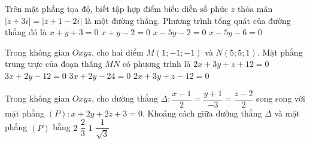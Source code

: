 \begin{ex}%
	Trên mặt phẳng tọa độ, biết tập hợp điểm biểu diễn số phức $z$ thỏa mãn $\left|z+3i\right|=\left| z+1-2i\right|$ là một đường thẳng. Phương trình tổng quát của đường thẳng đó là
	\choice
	{$x+y+3=0$}
	{$x+y-2=0$}
	{\True $x-5y-2=0$}
	{$x-5y-6=0$}
\end{ex}

\begin{ex}%
	Trong không gian $Oxyz$, cho hai điểm $M\left(1;-1;-1\right)$ và $N\left(5;5;1\right)$. Mặt phẳng trung trực của đoạn thẳng $MN$ có phương trình là
	\choice
	{$2x+3y+z+12=0$}
	{$3x+2y-12=0$}
	{$3x+2y-24=0$}
	{\True $2x+3y+z-12=0$}
\end{ex}

\begin{ex}%
	Trong không gian $Oxyz$, cho đường thẳng $\Delta \colon \dfrac{x-1}{2}=\dfrac{y+1}{-3}=\dfrac{z-2}{2}$ song song với mặt phẳng $(P)\colon x+2y+2z+3=0$. Khoảng cách giữa đường thẳng $\Delta$ và mặt phẳng $(P)$ bằng
	\choice
	{\True $2$}
	{$\dfrac{2}{3}$}
	{$1$}
	{$\dfrac{1}{\sqrt{3}}$}
\end{ex}


